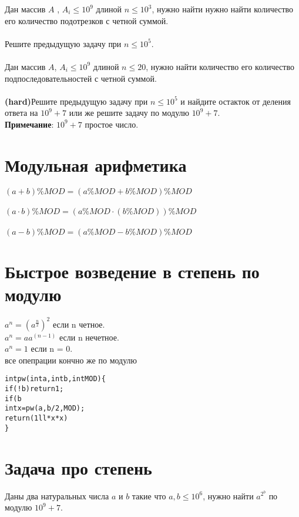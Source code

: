 \documentclass[10pt]{article}
\begin{document}
    Дан массив $A$ , $A_i \leq 10^9$ длиной $n \leq {10^3}$, нужно найти нужно найти количество его  количество подотрезков с четной суммой.
    \\
    \\
    Решите предыдущую задачу при $n \leq {10^5}$.
    \\
    \\
    Дан массив $A$, $A_i \leq 10^9$ длиной $n \leq {20}$, нужно найти количество его  количество подпоследовательностей с четной суммой.
    \\
    \\
    \textbf{(hard)}Решите предыдущую задачу при $n \leq {10^5}$ и найдите остакток от деления ответа на $10^9 + 7$ или же решите задачу по модулю $10^9 + 7$.
    \\
    \textbf{Примечание}:  $10^9 + 7$ простое число.
    \section{Модульная арифметика}
        $(a + b)\%MOD = (a\%MOD + b\%MOD)\%MOD$
        \\
        \\
        $(a \cdot b)\%MOD = (a\%MOD \cdot (b\%MOD))\%MOD$
        \\
        \\
        $(a - b)\%MOD = (a\%MOD - b\%MOD)\%MOD$
        
    \section{Быстрое возведение в степень по модулю}
        $a ^ n = {(a ^ \frac{n}{2})}^ 2$ если n четное.
        \\
        $a ^ n = {a  a ^ {(n - 1)}}$ если n нечетное.
        \\
        $a^n = 1$ если n = 0.
        \\
        все опепрации кончно же по модулю
    \begin{alltt}
int pw(int a, int b, int MOD)\{
    if(!b) return 1;
    if(b % 2) return (1ll * a * pw(a ,  b - 1 , MOD)) % MOD;
    int x = pw(a , b / 2, MOD);
    return (1ll * x * x) % MOD;
\}
    \end{alltt}
    \section{Задача про степень}
    
    Даны два натуральных числа $a$ и $b$ такие что $a , b \leq 10^6$, нужно найти \Large $a^{2^b}$ \normalsize по модулю $10^9+7$.
    
\end{document}
